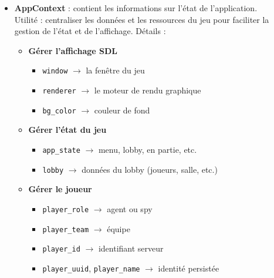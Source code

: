 \documentclass[12pt,a4paper]{article}
\begin{document}
        \begin{itemize}
            \item \textbf{AppContext} : contient les informations sur l’état de l’application.\\
                Utilité : centraliser les données et les ressources du jeu pour faciliter la gestion de l’état et de l’affichage.
                Détails :
                \begin{itemize}
                    \item \textbf{Gérer l’affichage SDL}
                    \begin{itemize}
                        \item \texttt{window} $\rightarrow$ la fenêtre du jeu
                        \item \texttt{renderer} $\rightarrow$ le moteur de rendu graphique
                        \item \texttt{bg\_color} $\rightarrow$ couleur de fond
                    \end{itemize}

                    \item \textbf{Gérer l’état du jeu}
                    \begin{itemize}
                        \item \texttt{app\_state} $\rightarrow$ menu, lobby, en partie, etc.
                        \item \texttt{lobby} $\rightarrow$ données du lobby (joueurs, salle, etc.)
                    \end{itemize}

                    \item \textbf{Gérer le joueur}
                    \begin{itemize}
                        \item \texttt{player\_role} $\rightarrow$ agent ou spy
                        \item \texttt{player\_team} $\rightarrow$ équipe
                        \item \texttt{player\_id} $\rightarrow$ identifiant serveur
                        \item \texttt{player\_uuid}, \texttt{player\_name} $\rightarrow$ identité persistée
                    \end{itemize}


\end{itemize}
\end{itemize}
\end{document}
